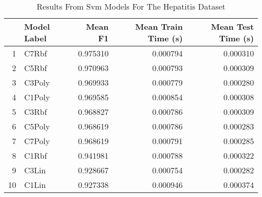 \begin{table}
\centering
\caption{Results From Svm Models For The Hepatitis Dataset}
\label{tab:svm_results_hepatitis}
\begin{tabular}{rlrrr}
\toprule
 & Model Label & Mean F1 & Mean Train Time (s) & Mean Test Time (s) \\
\midrule
1 & C7Rbf & 0.975310 & 0.000794 & 0.000310 \\
2 & C5Rbf & 0.970963 & 0.000793 & 0.000309 \\
3 & C3Poly & 0.969933 & 0.000779 & 0.000280 \\
4 & C1Poly & 0.969585 & 0.000854 & 0.000308 \\
5 & C3Rbf & 0.968827 & 0.000786 & 0.000309 \\
6 & C5Poly & 0.968619 & 0.000786 & 0.000283 \\
7 & C7Poly & 0.968619 & 0.000791 & 0.000285 \\
8 & C1Rbf & 0.941981 & 0.000788 & 0.000322 \\
9 & C3Lin & 0.928667 & 0.000754 & 0.000282 \\
10 & C1Lin & 0.927338 & 0.000946 & 0.000374 \\
\bottomrule
\end{tabular}
\end{table}
